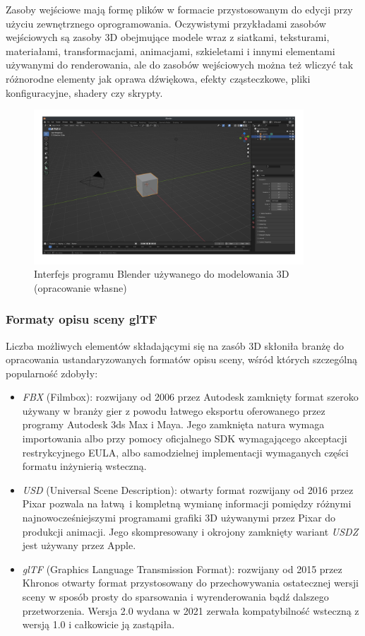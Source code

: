 Zasoby wejściowe mają formę plików w formacie przystosowanym do edycji przy użyciu zewnętrznego oprogramowania.
Oczywistymi przykładami zasobów wejściowych są zasoby 3D obejmujące modele wraz z siatkami, teksturami, materiałami, transformacjami, animacjami, szkieletami i innymi elementami używanymi do renderowania, ale do zasobów wejściowych można też wliczyć tak różnorodne elementy jak oprawa dźwiękowa, efekty cząsteczkowe, pliki konfiguracyjne, shadery czy skrypty.
\begin{figure}[htbp]
	\centering
	\includegraphics[width=0.9\textwidth]{images/blender.png}
	\caption{Interfejs programu Blender \cite{BLENDER} używanego do modelowania 3D (opracowanie własne)}
	\label{blendermodel}
\end{figure}


\subsubsection{Formaty opisu sceny glTF}

Liczba możliwych elementów składającymi się na zasób 3D skłoniła branżę do opracowania ustandaryzowanych formatów opisu sceny, wśród których szczególną popularność zdobyły:
\begin{itemize}
	\item \textit{FBX} (Filmbox): rozwijany od 2006 przez Autodesk zamknięty format szeroko używany w branży gier z powodu łatwego eksportu oferowanego przez programy Autodesk 3ds Max i Maya.
	Jego zamknięta natura wymaga importowania albo przy pomocy oficjalnego SDK wymagającego akceptacji restrykcyjnego EULA, albo samodzielnej implementacji wymaganych części formatu inżynierią wsteczną.
	\item \textit{USD} (Universal Scene Description): otwarty format rozwijany od 2016 przez Pixar pozwala na łatwą i kompletną wymianę informacji pomiędzy różnymi najnowocześniejszymi programami grafiki 3D używanymi przez Pixar do produkcji animacji.
	Jego skompresowany i okrojony zamknięty wariant \textit{USDZ} jest używany przez Apple.
	\item \textit{glTF} (Graphics Language Transmission Format): rozwijany od 2015 przez Khronos otwarty format przystosowany do przechowywania ostatecznej wersji sceny w sposób prosty do sparsowania i wyrenderowania bądź dalszego przetworzenia.
	Wersja 2.0 wydana w 2021 zerwała kompatybilność wsteczną z wersją 1.0 i całkowicie ją zastąpiła.
\end{itemize}

